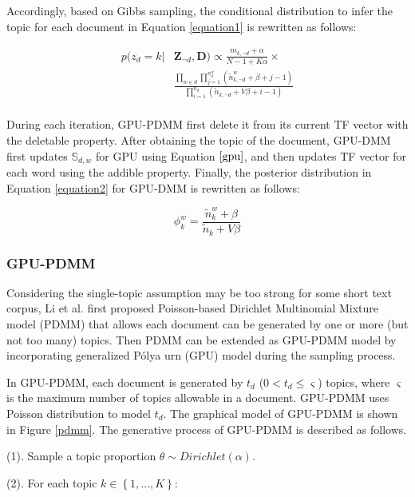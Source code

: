 \documentclass[10pt,journal,compsoc]{IEEEtran}
\begin{document}
Accordingly, based on Gibbs sampling, the conditional distribution to infer the topic for each document in Equation \ref{equation1} is rewritten as follows:

\begin{equation}
\begin{split}
 p(z_d=k|&\bm{Z}_{\neg d},\bm{D})\propto \frac{m_{k,\neg{d}}+\alpha}{N-1+K\alpha} \times\\
 & \frac{\prod_{w\in d}\prod_{j=1}^{n_d^w}(\widetilde{n}_{k,\neg{d}}^w+\beta+j-1)}{\prod_{i=1}^{n_{d}}(\widetilde{n}_{k,\neg{d}}+V\beta+i-1)}\\
\end{split}
\end{equation}

During each iteration, GPU-PDMM first delete it from its current TF vector with the deletable property. After obtaining the topic of the document, GPU-DMM first updates $\mathbb{S}_{d,w}$ for GPU using Equation $\ref{gpu}$, and then updates TF vector for each word using the addible property. Finally, the posterior distribution in Equation \ref{equation2} for GPU-DMM is rewritten as follows:

\begin{equation} \label{gpudmm_w}
\phi_k^w=\frac{\widetilde{n}^w_k+\beta}{\widetilde{n}_k+V\beta}
\end{equation}

\subsubsection{GPU-PDMM}

Considering the single-topic assumption may be too strong for some short text corpus, Li et al. \cite{li2017enhancing} first proposed Poisson-based Dirichlet Multinomial Mixture model (PDMM) that allows each document can be generated by one or more (but not too many) topics. Then PDMM can be extended as GPU-PDMM model by incorporating generalized P\'{o}lya urn (GPU) model during the sampling process. 

In GPU-PDMM, each document is generated by $t_d$ ($0<t_d\leq \varsigma$) topics, where $\varsigma$ is the maximum number of topics allowable in a document. GPU-PDMM uses Poisson distribution to model $t_d$. The graphical model of GPU-PDMM is shown in Figure \ref{pdmm}. The generative process of GPU-PDMM is described as follows. 

(1). Sample a topic proportion $\theta\sim Dirichlet(\alpha)$.

(2). For each topic $k\in\left\{1,...,K\right\}$:
\end{document}
